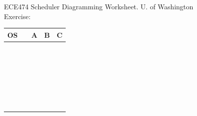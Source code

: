 \documentclass{article}
\begin{document}
ECE474 Scheduler Diagramming Worksheet.    U. of Washington\\
Exercise: \\[0.2in]
\renewcommand\arraystretch{1.7}%
\begin{tabular}{|p{1in}|p{0.2in}|p{1.2in}|p{1.2in}|p{1.2in}|}
\hline
OS      &  & A & B & C \\ \hline
        &  &   &   &   \\ \hline
        &  &   &   &   \\ \hline
        &  &   &   &   \\ \hline
        &  &   &   &   \\ \hline
        &  &   &   &   \\ \hline
        &  &   &   &   \\ \hline
        &  &   &   &   \\ \hline
        &  &   &   &   \\ \hline
        &  &   &   &   \\ \hline
        &  &   &   &   \\ \hline
        &  &   &   &   \\ \hline
        &  &   &   &   \\ \hline
        &  &   &   &   \\ \hline
        &  &   &   &   \\ \hline
        &  &   &   &   \\ \hline
        &  &   &   &   \\ \hline
        &  &   &   &   \\ \hline
        &  &   &   &   \\ \hline
        &  &   &   &   \\ \hline
        &  &   &   &   \\ \hline
        &  &   &   &   \\ \hline
        &  &   &   &   \\ \hline
        &  &   &   &   \\ \hline
        &  &   &   &   \\ \hline
        &  &   &   &   \\ \hline
        &  &   &   &   \\ \hline
        &  &   &   &   \\ \hline

\end{tabular}
\newpage
\end{document}
